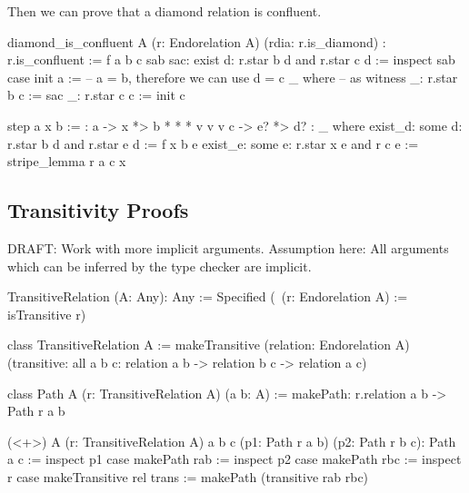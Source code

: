 Then we can prove that a diamond relation is confluent.

\begin{alba}
  diamond_is_confluent
    A
    (r: Endorelation A)
    (rdia: r.is_diamond)
    : r.is_confluent
    :=
      f a b c sab sac: exist d: r.star b d and r.star c d :=
        inspect sab case
          init a :=            -- a = b, therefore we can use d = c
            _ where            --        as witness
              _: r.star b c := sac
              _: r.star c c := init c

          step a x b :=
            {:  a  ->  x  *>  b
                *      *      *
                v      v      v
                c  ->  e? *>  d? :}
            _ where
              exist_d: some d: r.star b d and r.star e d := f x b e
              exist_e: some e: r.star x e and r c e := stripe_lemma r a c x

\end{alba}



\vskip 5mm
\subsection{Transitivity Proofs}

DRAFT: Work with more implicit arguments. Assumption here: All arguments which
can be inferred by the type checker are implicit.



\begin{alba}
    TransitiveRelation (A: Any): Any :=
        Specified (\ (r: Endorelation A) := isTransitive r)

    class
        TransitiveRelation A
    :=
        makeTransitive
            (relation: Endorelation A)
            (transitive:
                all a b c:
                    relation a b -> relation b c -> relation a c)

    class
        Path A (r: TransitiveRelation A) (a b: A)
    :=
        makePath: r.relation a b -> Path r a b


    (<+>)
        A (r: TransitiveRelation A) a b c
        (p1: Path r a b)
        (p2: Path r b c):
        Path a c
    :=
        inspect p1 case
            makePath rab :=
                inspect p2 case
                    makePath rbc :=
                        inspect r case
                            makeTransitive rel trans :=
                                makePath
                                    (transitive rab rbc)

\end{alba}










